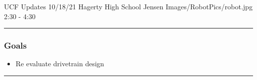 \insertmeeting 
	{UCF Updates} 
	{10/18/21} 
	{Hagerty High School}
	{Jensen}
	{Images/RobotPics/robot.jpg}
	{2:30 - 4:30}
	
\noindent\hfil\rule{\textwidth}{.4pt}\hfil
\subsubsection*{Goals}
\begin{itemize}
    \item Re evaluate drivetrain design 

\end{itemize} 

\noindent\hfil\rule{\textwidth}{.4pt}\hfil

